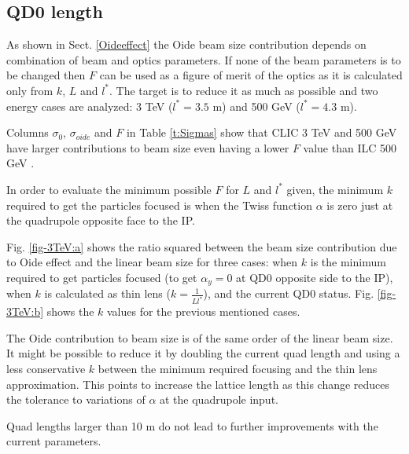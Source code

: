 \subsection{QD0 length}
As shown in Sect. \ref{Oideeffect} the Oide beam size contribution depends on combination of beam and optics parameters. %
If none of the beam parameters is to be changed then $F$ can be used as a figure of merit of the optics as it is calculated only from $k$, $L$ and $l^*$. The target is to reduce it as much as possible and two energy cases are analyzed: 3 TeV ($l^*=3.5$ m) and 500 GeV ($l^*=4.3$ m).\par
Columns $\sigma_0$, $\sigma_{oide}$ and $F$ in Table \ref{t:Sigmas} show that CLIC 3 TeV and 500 GeV \cite{CLICdes,TomasCLIC} have larger contributions to beam size even having a lower $F$ value than ILC 500 GeV \cite{ILCdes}.\par
In order to evaluate the minimum possible $F$ for $L$ and $l^*$ given, the minimum $k$ required to get the particles focused is when the Twiss function $\alpha$ is zero just at the quadrupole opposite face to the IP.\par
Fig. \ref{fig-3TeV:a}  shows the ratio squared between the beam size contribution due to Oide effect and the linear beam size for three cases: when $k$ is the minimum required to get particles focused (to get $\alpha_y=0$ at QD0 opposite side to the IP), when $k$ is calculated as thin lens ($k=\frac{1}{Ll^*}$), and the current QD0 status. Fig. \ref{fig-3TeV:b} shows the $k$ values for the previous mentioned cases.\par
The Oide contribution to beam size is of the same order of the linear beam size. It might be possible to reduce it by doubling the current quad length and using a less conservative $k$ between the minimum required focusing and the thin lens approximation. This points to increase the lattice length as this change reduces the tolerance to variations of $\alpha$ at the quadrupole input.\par
Quad lengths larger than 10 m do not lead to further improvements with the current parameters.\par


